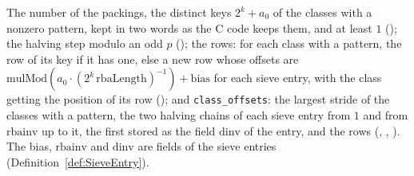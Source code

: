\begin{definition}\label{def:classOffsets}
  \leanok
  The number of the packings, the distinct keys $2^k + a_0$ of the classes with a nonzero pattern,
  kept in two words as the C code keeps them, and at least $1$
  (); the halving step modulo an odd $p$
  (); the rows: for each class with a pattern, the row of its key
  if it has one, else a new row whose offsets are
  $\mathrm{mulMod}(a_0 \cdot (2^k\,\mathrm{rbaLength})^{-1}) + \mathrm{bias}$ for each sieve entry,
  with the class getting the position of its row (); and
  \verb|class_offsets|: the largest stride of the classes with a pattern, the two halving chains of
  each sieve entry from $1$ and from $\mathrm{rbainv}$ up to it, the first stored as the field
  $\mathrm{dinv}$ of the entry, and the rows (,
  , ). The bias,
  $\mathrm{rbainv}$ and $\mathrm{dinv}$ are fields of the sieve entries
  (Definition~\ref{def:SieveEntry}).
\end{definition}

